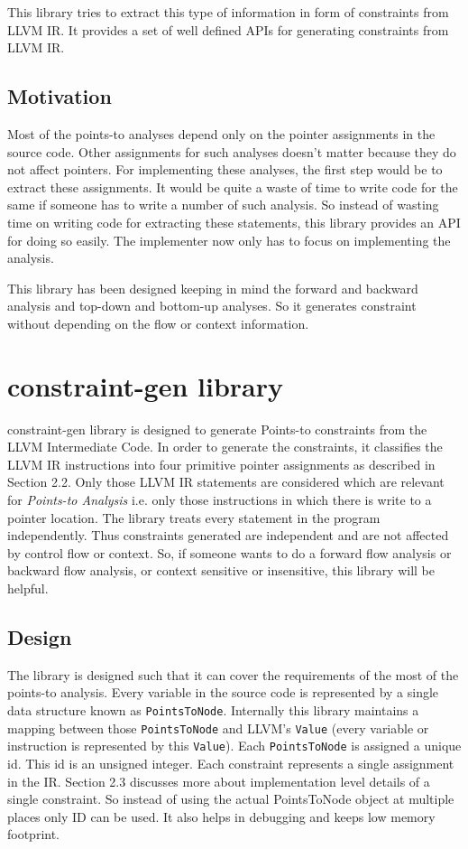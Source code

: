 \documentclass[a4paper,12pt]{report}
\begin{document}
This library tries to extract this type of information in form of constraints 
from LLVM IR. It provides a set of well defined APIs for generating constraints 
from LLVM IR.

\section{Motivation}
Most of the points-to analyses depend only on the pointer assignments in
the source code. Other assignments for such analyses doesn't matter because
they do not affect pointers. For implementing these analyses, the
first step would be to extract these assignments. It would be quite a waste of time
to write code for the same if someone has to write a number of such analysis.
So instead of wasting time on writing code for extracting these statements,
this library provides an API for doing so easily. The implementer now only
has to focus on implementing the analysis.

This library has been designed keeping in mind the forward and backward
analysis and top-down and bottom-up analyses. So it generates constraint
without depending on the flow or context information.

\chapter{constraint-gen library}

constraint-gen library is designed to generate Points-to constraints from the
LLVM Intermediate Code. In order to generate the constraints, it classifies the
LLVM IR instructions into four primitive pointer assignments as described 
in Section 2.2. Only those LLVM IR statements are considered which are
relevant for \textit{Points-to Analysis} i.e. only those instructions in which 
there is write to a pointer location. The library treats every statement in the
program independently. Thus constraints generated are independent and are not 
affected by control flow or context. So, if someone wants to do a 
forward flow analysis or backward flow analysis, or context sensitive or 
insensitive, this library will be helpful.

\section{Design}
The library is designed such that it can cover the requirements of the most of the
points-to analysis. Every variable in the source code is represented by a single data
structure known as \texttt{PointsToNode}. Internally this library maintains a mapping 
between those \texttt{PointsToNode} and LLVM's \texttt{Value} (every variable or instruction is 
represented by this \texttt{Value}). Each \texttt{PointsToNode} is assigned a unique id. This 
id is an unsigned integer. Each constraint represents a single assignment in 
the IR. Section 2.3 discusses more about implementation level details 
of a single constraint. So instead of using the actual PointsToNode object at
multiple places only ID can be used. It also helps in debugging and keeps low
memory footprint.
\end{document}
